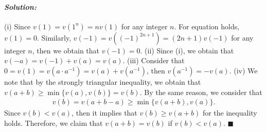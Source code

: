 \documentclass[12pt, a4paper]{article}
\theoremstyle{remark}
\newenvironment{solution}
  {\paragraph{\textit{Solution:}}\par\medskip}
  {\hfill$\blacksquare$\vspace{0.1cm}}
\begin{document}
\begin{solution}
    (i) Since $v(1) = v(1^n) = n v(1)$ for any integer $n$. For equation holds, $v(1)=0$. Similarly, $v(-1)=v((-1)^{2n+1}) = (2n+1)v(-1)$ for any integer $n$, then we obtain that $v(-1)=0$.
    (ii) Since (i), we obtain that $v(-a)=v(-1)+v(a) = v(a)$.
    (iii) Consider that $0=v(1)=v(a\cdot a^{-1})=v(a)+v(a^{-1})$, then $v(a^{-1})=-v(a)$.
    (iv) We note that by the strongly triangular inequality, we obtain that $v(a+b)\ge \min\{v(a),v(b)\}=v(b)$. By the same reason, we consider that 
    \begin{align*}
        v(b)=v(a+b-a)\ge \min\{v(a+b),v(a)\}.
    \end{align*}
    Since $v(b)<v(a)$, then it implies that $v(b)\ge v(a+b) $ for the inequality holds. Therefore, we claim that $v(a+b)=v(b)$ if $v(b)<v(a)$.
\end{solution}
\end{document}
